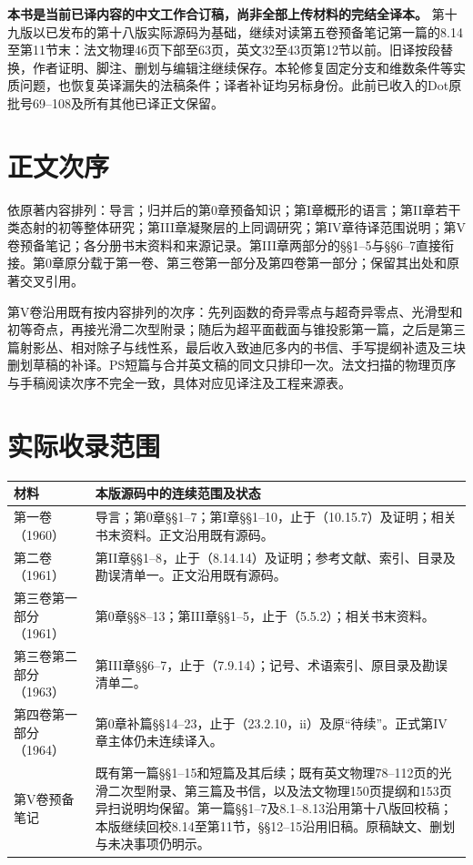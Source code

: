 \maketitle
{}
\noindent\textbf{本书是当前已译内容的中文工作合订稿，尚非全部上传材料的完结全译本。}
第十九版以已发布的第十八版实际源码为基础，继续对读第五卷预备笔记第一篇的8.14至第11节末：法文物理46页下部至63页，英文32至43页第12节以前。旧译按段替换，作者证明、脚注、删划与编辑注继续保存。本轮修复固定分支和维数条件等实质问题，也恢复英译漏失的法稿条件；译者补证均另标身份。此前已收入的Dot原批号69--108及所有其他已译正文保留。

\section*{正文次序}
依原著内容排列：导言；归并后的第0章预备知识；第I章概形的语言；第II章若干类态射的初等整体研究；第III章凝聚层的上同调研究；第IV章待译范围说明；第V卷预备笔记；各分册书末资料和来源记录。第III章两部分的§§1--5与§§6--7直接衔接。第0章原分载于第一卷、第三卷第一部分及第四卷第一部分；保留其出处和原著交叉引用。

第V卷沿用既有按内容排列的次序：先列函数的奇异零点与超奇异零点、光滑型和初等奇点，再接光滑二次型附录；随后为超平面截面与锥投影第一篇，之后是第三篇射影丛、相对除子与线性系，最后收入致迪厄多内的书信、手写提纲补遗及三块删划草稿的补译。PS短篇与合并英文稿的同文只排印一次。法文扫描的物理页序与手稿阅读次序不完全一致，具体对应见译注及工程来源表。

\clearpage
\section*{实际收录范围}
\begin{longtable}{@{}p{.25\linewidth}p{.67\linewidth}@{}}
\toprule 材料&本版源码中的连续范围及状态\\\midrule\endhead
第一卷（1960）&导言；第0章§§1--7；第I章§§1--10，止于（10.15.7）及证明；相关书末资料。正文沿用既有源码。\\
第二卷（1961）&第II章§§1--8，止于（8.14.14）及证明；参考文献、索引、目录及勘误清单一。正文沿用既有源码。\\
第三卷第一部分（1961）&第0章§§8--13；第III章§§1--5，止于（5.5.2）；相关书末资料。\\
第三卷第二部分（1963）&第III章§§6--7，止于（7.9.14）；记号、术语索引、原目录及勘误清单二。\\
第四卷第一部分（1964）&第0章补篇§§14--23，止于（23.2.10，ii）及原“待续”。正式第IV章主体仍未连续译入。\\
第V卷预备笔记&既有第一篇§§1--15和短篇及其后续；既有英文物理78--112页的光滑二次型附录、第三篇及书信，以及法文物理150页提纲和153页异扫说明均保留。第一篇§§1--7及8.1--8.13沿用第十八版回校稿；本版继续回校8.14至第11节，§§12--15沿用旧稿。原稿缺文、删划与未决事项仍明示。\\
\bottomrule
\end{longtable}

